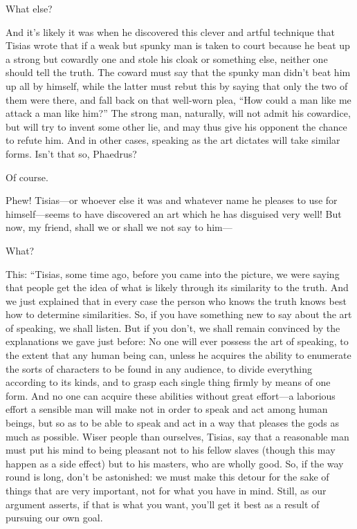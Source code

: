 \sayphaedrus What else?

\saysocrates And it’s likely it was when he discovered this clever and
artful technique that Tisias wrote that if a weak but spunky man is
taken to court because he beat up a strong but cowardly one and stole
his cloak or something else, neither one should tell the truth. The
coward must say that the spunky man didn’t beat him up all by himself,
while the latter must rebut this by saying that only the two of
them were there, and fall back on that well-worn plea, “How could a man
like me attack a man like him?” The strong man, naturally, will not
admit his cowardice, but will try to invent some other lie, and may thus
give his opponent the chance to refute him. And in other cases, speaking
as the art dictates will take similar forms. Isn’t that so, Phaedrus?

\sayphaedrus Of course.

\saysocrates Phew! Tisias---or whoever else it was and whatever name he
pleases to use for
himself---seems
to have discovered an art which he has disguised very well! But now, my
friend, shall we or shall we not say to him---

\sayphaedrus What?

\saysocrates This: “Tisias, some time ago, before you came into the
picture, we were saying that people get the idea of what is likely
through its similarity to the truth. And we just explained that in every
case the person who knows the truth knows best how to determine
similarities. So, if you have something new to say about the art of
speaking, we shall listen. But if you don’t, we shall remain convinced
by the explanations we gave just before: No one will ever possess the
art of speaking, to the extent that any human being can, unless
he acquires the ability to enumerate the sorts of characters to be found
in any audience, to divide everything according to its kinds, and to
grasp each single thing firmly by means of one form. And no one can
acquire these abilities without great effort---a laborious effort a
sensible man will make not in order to speak and act among human beings,
but so as to be able to speak and act in a way that pleases the gods as
much as possible. Wiser people than ourselves, Tisias, say that a
reasonable man must put his mind to being pleasant not to his fellow 
slaves (though this may happen as a side effect) but to
his masters, who are wholly good. So, if the way round is long, don’t be
astonished: we must make this detour for the sake of things that are
very important, not for what you have in mind. Still, as our argument
asserts, if that is what you want, you’ll get it best as a result of
pursuing our own goal.


